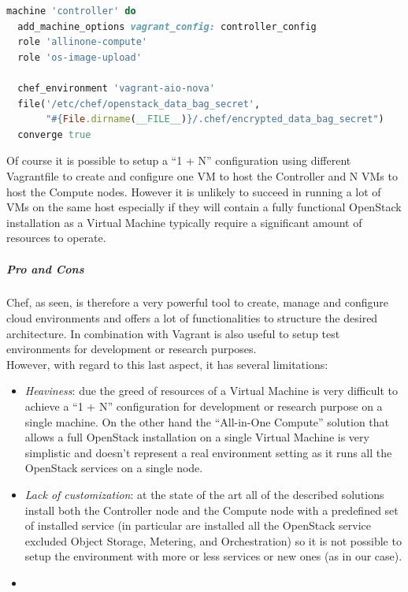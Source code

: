 \begin{lstlisting}[language=Ruby]
machine 'controller' do
  add_machine_options vagrant_config: controller_config
  role 'allinone-compute'
  role 'os-image-upload'

  chef_environment 'vagrant-aio-nova'
  file('/etc/chef/openstack_data_bag_secret',
       "#{File.dirname(__FILE__)}/.chef/encrypted_data_bag_secret")
  converge true
\end{lstlisting}

Of course it is possible to setup a ``1 + N'' configuration using different Vagrantfile to create and configure one VM to host the Controller and N VMs to host the Compute nodes. However it is unlikely to succeed in running a lot of VMs on the same host especially if they will contain a fully functional OpenStack installation as a Virtual Machine typically require a significant amount of resources to operate.


\subparagraph{Pro and Cons}
\label{subp:sota_chef_pro_cons}

Chef, as seen, is therefore a very powerful tool to create, manage and configure cloud environments and offers a lot of functionalities to structure the desired architecture. In combination with Vagrant is also useful to setup test environments for development or research purposes.\\
However, with regard to this last aspect, it has several limitations:
\begin{itemize}
\item \textit{Heaviness}: due the greed of resources of a Virtual Machine is very difficult to achieve a ``1 + N'' configuration for development or research purpose on a single machine. On the other hand the ``All-in-One Compute'' solution that allows a full OpenStack installation on a single Virtual Machine is very simplistic and doesn't represent a real environment setting as it runs all the OpenStack services on a single node.
\item \textit{Lack of customization}: at the state of the art all of the described solutions install both the Controller node and the Compute node with a predefined set of installed service (in particular are installed all the OpenStack service excluded Object Storage, Metering, and Orchestration) so it is not possible to setup the environment with more or less services or new ones (as in our case).
\item {}
\end{itemize}


